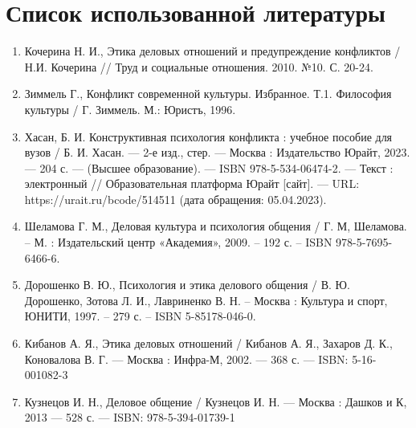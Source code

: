 \documentclass[a4paper,14pt]{extarticle}
\begin{document}
\pagebreak
\section{Список использованной литературы}

\begin{enumerate}
    \item Кочерина Н. И., Этика деловых отношений и предупреждение конфликтов / Н.И. Кочерина // Труд и социальные отношения. 2010. №10. С. 20-24.
    \item Зиммель Г., Конфликт современной культуры. Избранное. Т.1. Философия культуры / Г. Зиммель. М.: Юристъ, 1996.
    \item  Хасан, Б. И.  Конструктивная психология конфликта : учебное пособие для вузов / Б. И. Хасан. — 2-е изд., стер. — Москва : Издательство Юрайт, 2023. — 204 с. — (Высшее образование). — ISBN 978-5-534-06474-2. — Текст : электронный // Образовательная платформа Юрайт [сайт]. — URL: https://urait.ru/bcode/514511 (дата обращения: 05.04.2023).
    \item Шеламова Г. М., Деловая культура и психология общения / Г. М, Шеламова. – М. : Издательский центр «Академия», 2009. – 192 с. – ISBN 978-5-7695-6466-6.
    \item  Дорошенко В. Ю., Психология и этика делового общения / В. Ю. Дорошенко, Зотова Л. И., Лавриненко В. Н. – Москва : Культура и спорт, ЮНИТИ, 1997. – 279 с. – ISBN 5-85178-046-0.
    \item Кибанов А. Я., Этика деловых отношений / Кибанов А. Я., Захаров Д. К., Коновалова В. Г. — Москва : Инфра-М, 2002. — 368 с. — ISBN: 5-16-001082-3
    \item Кузнецов И. Н., Деловое общение / Кузнецов И. Н. — Москва : Дашков и К, 2013 — 528 с. — ISBN: 978-5-394-01739-1
\end{enumerate}
\end{document}
